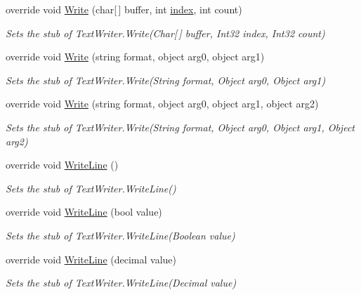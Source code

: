 \begin{DoxyCompactItemize}
override void \hyperlink{class_system_1_1_i_o_1_1_fakes_1_1_stub_text_writer_ad64e48ce8d6ebf1d2bb0a628c2467427}{Write} (char\mbox{[}$\,$\mbox{]} buffer, int \hyperlink{jquery-1_810_82-vsdoc_8js_a75bb12d1f23302a9eea93a6d89d0193e}{index}, int count)
\begin{DoxyCompactList}\small\item\em Sets the stub of Text\-Writer.\-Write(\-Char\mbox{[}$\,$\mbox{]} buffer, Int32 index, Int32 count)\end{DoxyCompactList}\item 
override void \hyperlink{class_system_1_1_i_o_1_1_fakes_1_1_stub_text_writer_a2272004d714b07130166d8f475ab6b2b}{Write} (string format, object arg0, object arg1)
\begin{DoxyCompactList}\small\item\em Sets the stub of Text\-Writer.\-Write(\-String format, Object arg0, Object arg1)\end{DoxyCompactList}\item 
override void \hyperlink{class_system_1_1_i_o_1_1_fakes_1_1_stub_text_writer_a5d00e5cdb2b56ed2a2e66e984dc68013}{Write} (string format, object arg0, object arg1, object arg2)
\begin{DoxyCompactList}\small\item\em Sets the stub of Text\-Writer.\-Write(\-String format, Object arg0, Object arg1, Object arg2)\end{DoxyCompactList}\item 
override void \hyperlink{class_system_1_1_i_o_1_1_fakes_1_1_stub_text_writer_ad5318383c3e53cddfdf2bd3e94460f4f}{Write\-Line} ()
\begin{DoxyCompactList}\small\item\em Sets the stub of Text\-Writer.\-Write\-Line()\end{DoxyCompactList}\item 
override void \hyperlink{class_system_1_1_i_o_1_1_fakes_1_1_stub_text_writer_a59fbbc62e2396504c94bf082aae15dcf}{Write\-Line} (bool value)
\begin{DoxyCompactList}\small\item\em Sets the stub of Text\-Writer.\-Write\-Line(\-Boolean value)\end{DoxyCompactList}\item 
override void \hyperlink{class_system_1_1_i_o_1_1_fakes_1_1_stub_text_writer_a59751a5e81ab5ccdc11d8ada0084ced3}{Write\-Line} (decimal value)
\begin{DoxyCompactList}\small\item\em Sets the stub of Text\-Writer.\-Write\-Line(\-Decimal value)\end{DoxyCompactList}\item 

\end{DoxyCompactItemize}
